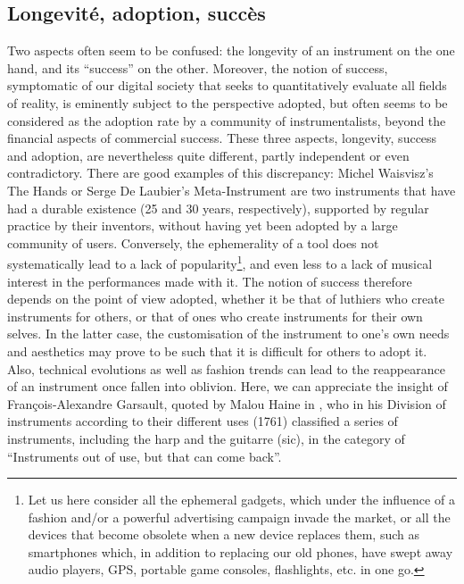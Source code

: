 \subsection{Longevité, adoption, succès}
Two aspects often seem to be confused: the longevity of an instrument on the one hand, and its “success” on the other. Moreover, the notion of success, symptomatic of our digital society that seeks to quantitatively evaluate all fields of reality, is eminently subject to the perspective adopted, but often seems to be considered as the adoption rate by a community of instrumentalists, beyond the financial aspects of commercial success.
	These three aspects, longevity, success and adoption, are nevertheless quite different, partly independent or even contradictory. There are good examples of this discrepancy: Michel Waisvisz's The Hands \cite{torre_hands:_2016} or Serge De Laubier's Meta-Instrument \cite{couprie_meta-instrument:_2018} are two instruments that have had a durable existence (25 and 30 years, respectively), supported by regular practice by their inventors, without having yet been adopted by a large community of users. Conversely, the ephemerality of a tool does not systematically lead to a lack of popularity\footnote{Let us here consider all the ephemeral gadgets, which under the influence of a fashion and/or a powerful advertising campaign invade the market, or all the devices that become obsolete when a new device replaces them, such as smartphones which, in addition to replacing our old phones, have swept away audio players, GPS, portable game consoles, flashlights, etc. in one go.}, and even less to a lack of musical interest in the performances made with it.
	The notion of success therefore depends on the point of view adopted, whether it be that of luthiers who create instruments for others, or that of ones who create instruments for their own selves. In the latter case, the customisation of the instrument to one's own needs and aesthetics may prove to be such that it is difficult for others to adopt it.
	Also, technical evolutions as well as fashion trends can lead to the reappearance of an instrument once fallen into oblivion. Here, we can appreciate the insight of François-Alexandre Garsault, quoted by Malou Haine in \cite{haine_les_2018}, who in his Division of instruments according to their different uses (1761) classified a series of instruments, including the harp and the guitarre (sic), in the category of “Instruments out of use, but that can come back”.

